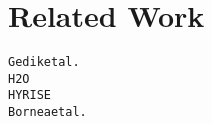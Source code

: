 \section{Related Work}

\begin{alltt}\scriptsize
Gedik et al.~\cite{gedik14}
H2O \cite{alagiannis14}
HYRISE~\cite{grund10}
Bornea et al.~\cite{bornea13}
\end{alltt}

